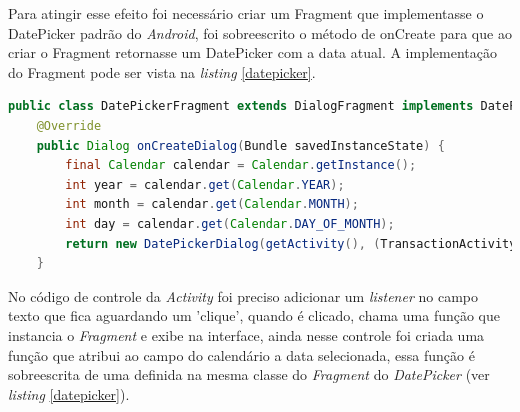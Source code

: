\documentclass[hidelinks,12pt]{article}
\begin{document}
Para atingir esse efeito foi necess\'ario criar um Fragment que implementasse o DatePicker padr\~ao do \textit{Android}, foi sobreescrito o m\'etodo de onCreate para que ao criar o Fragment retornasse um DatePicker com a data atual. A implementa\c{c}\~ao do Fragment pode ser vista na \textit{listing} \ref{datepicker}.
\newpage
\begin{lstlisting}[language=Java, caption=\textit{Fragment} do calend\'ario, captionpos=b, breaklines=true, label=datepicker]
public class DatePickerFragment extends DialogFragment implements DatePickerDialog.OnDateSetListener{
	@Override
	public Dialog onCreateDialog(Bundle savedInstanceState) {
		final Calendar calendar = Calendar.getInstance();
		int year = calendar.get(Calendar.YEAR);
		int month = calendar.get(Calendar.MONTH);
		int day = calendar.get(Calendar.DAY_OF_MONTH);
		return new DatePickerDialog(getActivity(), (TransactionActivity)getActivity(), year,month,day);
	}
\end{lstlisting}
No c\'odigo de controle da \textit{Activity} foi preciso adicionar um \textit{listener} no campo texto que fica aguardando um 'clique', quando \'e clicado, chama uma fun\c{c}\~ao que instancia o \textit{Fragment} e exibe na interface, ainda nesse controle foi criada uma fun\c{c}\~ao que atribui ao campo do calend\'ario a data selecionada, essa fun\c{c}\~ao \'e sobreescrita de uma definida na mesma classe do \textit{Fragment} do \textit{DatePicker} (ver \textit{listing} \ref{datepicker}).
\end{document}
